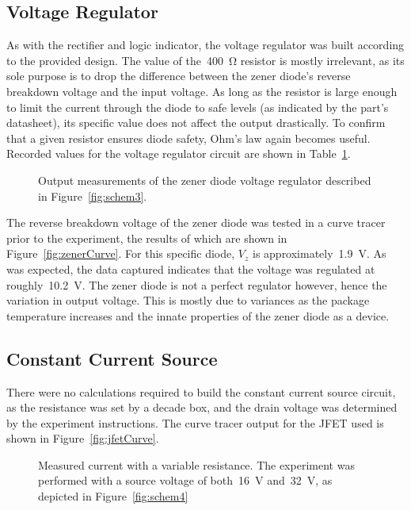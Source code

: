 \subsection{Voltage Regulator}
As with the rectifier and logic indicator, the voltage regulator was built
according to the provided design.  The value of the~\SI{400}{\ohm} resistor is
mostly irrelevant, as its sole purpose is to drop the difference between the
zener diode's reverse breakdown voltage and the input voltage.  As long as the
resistor is large enough to limit the current through the diode to safe levels
(as indicated by the part's datasheet), its specific value does not affect the
output drastically.  To confirm that a given resistor ensures diode safety,
Ohm's law again becomes useful.  Recorded values for the voltage regulator
circuit are shown in Table~\ref{tab:ckt3data}.
%
\begin{figure}[H]
	\centering
	
	\caption{Output measurements of the zener diode voltage
		regulator described in Figure~\ref{fig:schem3}.}
	\label{tab:ckt3data}
\end{figure}
%
The reverse breakdown voltage of the zener diode was tested in a curve tracer
prior to the experiment, the results of which are shown in
Figure~\ref{fig:zenerCurve}.  For this specific diode, $V_z$ is
approximately~\SI{1.9}{\volt}.  As was expected, the data captured indicates
that the voltage was regulated at roughly~\SI{10.2}{\volt}.  The zener diode is
not a perfect regulator however, hence the variation in output voltage.  This
is mostly due to variances as the package temperature increases and the innate
properties of the zener diode as a device.

\subsection{Constant Current Source}
There were no calculations required to build the constant current source
circuit, as the resistance was set by a decade box, and the drain voltage was
determined by the experiment instructions.  The curve tracer output for the
JFET used is shown in Figure~\ref{fig:jfetCurve}.
%
\begin{figure}[H]
	\centering
	
	\caption{Measured current with a variable resistance.  The experiment was
		performed with a source voltage of both~\SI{16}{\volt}
		and~\SI{32}{\volt}, as depicted in Figure~\ref{fig:schem4}}
	\label{tab:ckt4data}
\end{figure}
